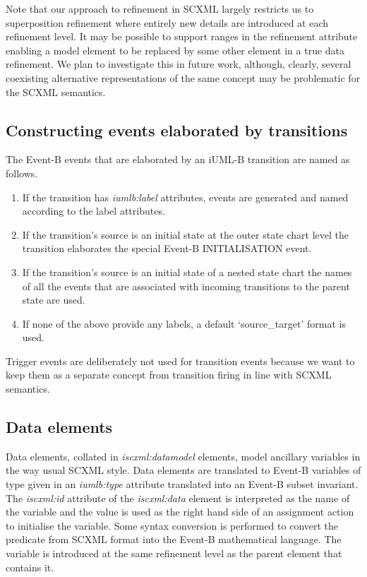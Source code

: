Note that our approach to refinement in SCXML largely restricts us to superposition 
refinement where entirely new details are introduced at each refinement level.  
It may be possible to support ranges in the refinement attribute enabling a model 
element to be replaced by some other element in a true data refinement. We plan to 
investigate this in future work, although, clearly, several coexisting alternative 
representations of the same concept may be problematic for the SCXML semantics.

\subsection{Constructing events elaborated by transitions}
The Event-B events that are elaborated by an iUML-B  transition are named as follows. 

\begin{enumerate}
\item If the transition has \emph{iumlb:label} attributes, events are generated 
and named according to the label attributes.
\item If the transition's source is an initial state at the outer state chart 
level the transition elaborates the special Event-B INITIALISATION event. 
\item If the transition's source is an initial state of a nested state chart 
the names of all the events that are associated with incoming transitions to 
the parent state are used.
\item If none of the above provide any labels, a default  `source\_target' format is used.
\end{enumerate}

Trigger events are deliberately not used for transition events because we 
want to keep them as a separate concept from transition firing in line 
with SCXML semantics.

\subsection{Data elements}
Data elements, collated in \emph{iscxml:datamodel} elements, model ancillary 
variables in the way usual SCXML style. Data elements are translated to 
Event-B variables of type given in an \emph{iumlb:type} attribute translated 
into an Event-B subset invariant.  The \emph{iscxml:id} attribute of the 
\emph{iscxml:data} element is interpreted as the name of the variable and 
the value is used as the right hand side of an assignment action to initialise 
the variable.  Some syntax conversion is performed to convert the predicate from 
SCXML format into the Event-B mathematical language. The variable is introduced 
at the same refinement level as the parent element that contains it.


